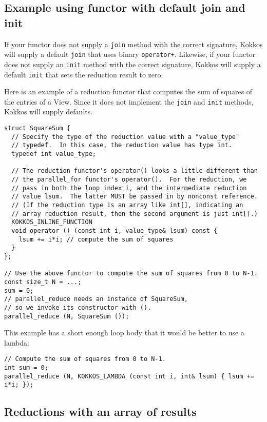 \subsection{Example using functor with default join and init}

If your functor does not supply a \lstinline!join! method with the correct signature,
Kokkos will supply a default \lstinline!join! that uses binary \lstinline!operator+!.
Likewise, if your functor does not supply an \lstinline!init! method with the correct signature,
Kokkos will supply a default \lstinline!init! that sets the reduction result to zero.

Here is an example of a reduction functor that computes the sum of squares
of the entries of a View.
Since it does not implement the \lstinline!join! and \lstinline!init! methods,
Kokkos will supply defaults.
\begin{lstlisting}
struct SquareSum {
  // Specify the type of the reduction value with a "value_type"
  // typedef.  In this case, the reduction value has type int.
  typedef int value_type;

  // The reduction functor's operator() looks a little different than
  // the parallel_for functor's operator().  For the reduction, we
  // pass in both the loop index i, and the intermediate reduction
  // value lsum.  The latter MUST be passed in by nonconst reference.
  // (If the reduction type is an array like int[], indicating an
  // array reduction result, then the second argument is just int[].)
  KOKKOS_INLINE_FUNCTION
  void operator () (const int i, value_type& lsum) const {
    lsum += i*i; // compute the sum of squares
  }
};

// Use the above functor to compute the sum of squares from 0 to N-1.
const size_t N = ...;
sum = 0;
// parallel_reduce needs an instance of SquareSum, 
// so we invoke its constructor with ().
parallel_reduce (N, SquareSum ());
\end{lstlisting}
This example has a short enough loop body that it would be better to use a lambda:
\begin{lstlisting}
// Compute the sum of squares from 0 to N-1.
int sum = 0;
parallel_reduce (N, KOKKOS_LAMBDA (const int i, int& lsum) { lsum += i*i; });
\end{lstlisting}

\subsection{Reductions with an array of results}

